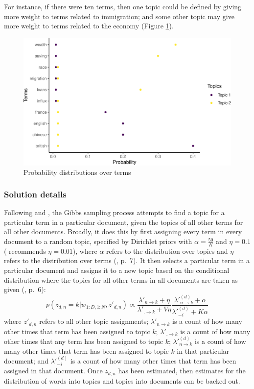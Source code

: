 \documentclass[12pt,]{article}
\theoremstyle{definition}
\theoremstyle{definition}
\theoremstyle{definition}
\theoremstyle{remark}
\begin{document}
For instance, if there were ten terms, then one topic could be defined
by giving more weight to terms related to immigration; and some other
topic may give more weight to terms related to the economy (Figure
\ref{fig:topicsoverterms}).

\begin{figure}
\centering
\includegraphics{svm-rmarkdown-article-example_files/figure-latex/topicsoverterms-1.pdf}
\caption{\label{fig:topicsoverterms}Probability distributions over terms}
\end{figure}

\subsubsection{Solution details}\label{solution-details}

Following \citet{SteyversGriffiths2006} and \citet{Darling2011}, the
Gibbs sampling process attempts to find a topic for a particular term in
a particular document, given the topics of all other terms for all other
documents. Broadly, it does this by first assigning every term in every
document to a random topic, specified by Dirichlet priors with
\(\alpha = \frac{50}{K}\) and \(\eta = 0.1\)
(\citet{SteyversGriffiths2006} recommends \(\eta = 0.01\)), where
\(\alpha\) refers to the distribution over topics and \(\eta\) refers to
the distribution over terms (\citet{Grun2011}, p.~7). It then selects a
particular term in a particular document and assigns it to a new topic
based on the conditional distribution where the topics for all other
terms in all documents are taken as given (\citet{Grun2011}, p.~6):
\[p(z_{d, n}=k | w_{1:D, 1:N}, z'_{d, n}) \propto \frac{\lambda'_{n\rightarrow k}+\eta}{\lambda'_{.\rightarrow k}+V\eta} \frac{\lambda'^{(d)}_{n\rightarrow k}+\alpha}{\lambda'^{(d)}_{-i}+K\alpha} \]
where \(z'_{d, n}\) refers to all other topic assignments;
\(\lambda'_{n\rightarrow k}\) is a count of how many other times that
term has been assigned to topic \(k\); \(\lambda'_{.\rightarrow k}\) is
a count of how many other times that any term has been assigned to topic
\(k\); \(\lambda'^{(d)}_{n\rightarrow k}\) is a count of how many other
times that term has been assigned to topic \(k\) in that particular
document; and \(\lambda'^{(d)}_{-i}\) is a count of how many other times
that term has been assigned in that document. Once \(z_{d,n}\) has been
estimated, then estimates for the distribution of words into topics and
topics into documents can be backed out.
\end{document}
